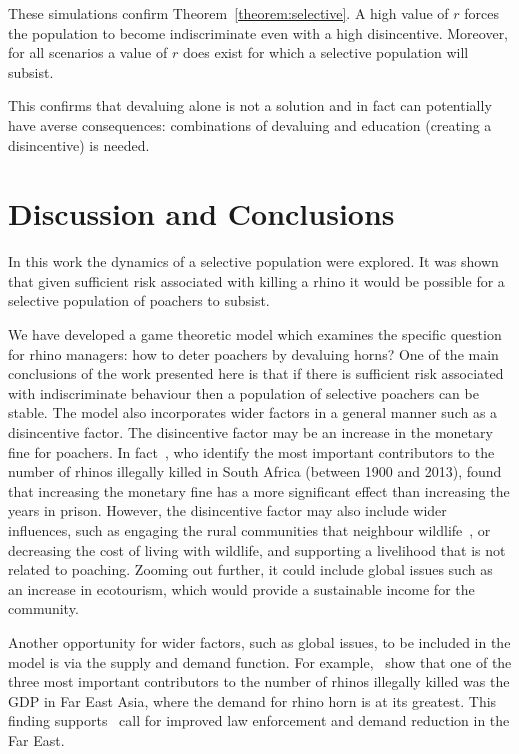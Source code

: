 \documentclass[10pt]{article}
\begin{document}
These simulations confirm Theorem~\ref{theorem:selective}. A high value of \(r\)
forces the population to become indiscriminate even with a high disincentive.
Moreover, for all scenarios a value of \(r\) does exist for which a selective
population will subsist.

This confirms that devaluing alone is not a solution and in fact can
potentially have averse consequences: combinations of devaluing and
education (creating a disincentive) is needed.

\section{Discussion and Conclusions}
\label{section:discussion}

In this work the dynamics of a selective population were explored. It was shown
that given sufficient risk associated with killing a rhino it would be possible
for a selective population of poachers to subsist.

We have developed a game theoretic model which examines the specific question
for rhino managers: how to deter poachers by devaluing horns?  One of the main
conclusions of the work presented here is that if there is sufficient risk
associated with indiscriminate behaviour then a population of selective poachers
can be stable. The model also incorporates wider factors in a general manner such as
a disincentive factor. The disincentive factor may be an increase in the
monetary fine for poachers. In fact~\cite{di2015identification}, who identify
the most important contributors to the number of rhinos illegally killed in
South Africa (between 1900 and 2013), found that increasing the monetary fine
has a more significant effect than increasing the years in prison. However, the
disincentive factor may also include wider influences, such as engaging the
rural communities that neighbour wildlife~\cite{Duan2013}, or decreasing the
cost of living with wildlife, and supporting a livelihood that is not related to
poaching. Zooming out further, it could include global issues such as an
increase in ecotourism, which would provide a sustainable income for the
community.

Another opportunity for wider factors, such as global issues, to be included in
the model is via the supply and demand function. For example,~\cite{di2015identification}
show that one of the three most important contributors to the number of rhinos illegally
killed was the GDP in Far East Asia, where the demand for rhino horn is at its greatest.
This finding supports~\cite{lawson2014global} call for improved law enforcement and
demand reduction in the Far East.
\end{document}
